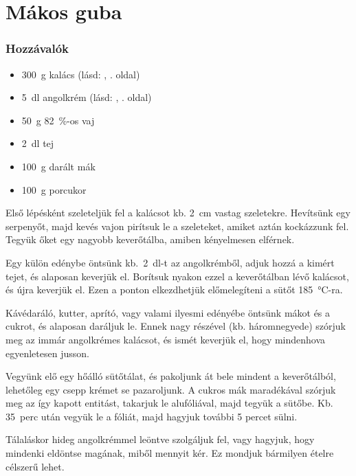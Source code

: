 \newpage
\section{Mákos guba} \label{sec:makos_guba}

\subsubsection*{Hozzávalók}
\begin{itemize}
    \item \qty{300}{\g} kalács (lásd: , \pageref{sec:kalacs}. oldal)
    \item \qty{5}{\deci\l} angolkrém (lásd: , \pageref{sec:angolkem}. oldal)
    \item \qty{50}{\g} \qty{82}{\percent}-os vaj
    \item \qty{2}{\deci\l} tej
    \item \qty{100}{\g} darált mák
    \item \qty{100}{\g} porcukor
\end{itemize}

Első lépésként szeleteljük fel a kalácsot kb. \qty{2}{\cm} vastag szeletekre. Hevítsünk egy serpenyőt, majd kevés vajon pirítsuk le a szeleteket, amiket aztán kockázzunk fel. Tegyük őket egy nagyobb keverőtálba, amiben kényelmesen elférnek.

Egy külön edénybe öntsünk kb.~\qty{2}{\deci\l}-t az angolkrémből, adjuk hozzá a kimért tejet, és alaposan keverjük el. Borítsuk nyakon ezzel a keverőtálban lévő kalácsot, és újra keverjük el. Ezen a ponton elkezdhetjük előmelegíteni a sütőt \qty{185}{\celsius}-ra.

Kávédaráló, kutter, aprító, vagy valami ilyesmi edényébe öntsünk mákot és a cukrot, és alaposan daráljuk le. Ennek nagy részével (kb. háromnegyede) szórjuk meg az immár angolkrémes kalácsot, és ismét keverjük el, hogy mindenhova egyenletesen jusson.

Vegyünk elő egy hőálló sütőtálat, és pakoljunk át bele mindent a keverőtálból, lehetőleg egy csepp krémet se pazaroljunk. A cukros mák maradékával szórjuk meg az így kapott entitást, takarjuk le alufóliával, majd tegyük a sütőbe. Kb. \num{35}~perc után vegyük le a fóliát, majd hagyjuk további \num{5} percet sülni.

Tálaláskor hideg angolkrémmel leöntve szolgáljuk fel, vagy hagyjuk, hogy mindenki eldöntse magának, miből mennyit kér. Ez mondjuk bármilyen ételre célszerű lehet.
